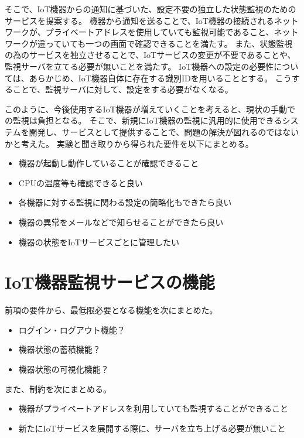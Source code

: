 そこで、IoT機器からの通知に基づいた、設定不要の独立した状態監視のためのサービスを提案する。
機器から通知を送ることで、IoT機器の接続されるネットワークが、プライベートアドレスを使用していても監視可能であること、ネットワークが違っていても一つの画面で確認できることを満たす。
また、状態監視の為のサービスを独立させることで、IoTサービスの変更が不要であることや、監視サーバを立てる必要が無いことを満たす。
IoT機器への設定の必要性については、あらかじめ、IoT機器自体に存在する識別IDを用いることとする。
こうすることで、監視サーバに対して、設定をする必要がなくなる。



このように、今後使用するIoT機器が増えていくことを考えると、現状の手動での監視は負担となる。
そこで、新規にIoT機器の監視に汎用的に使用できるシステムを開発し、サービスとして提供することで、問題の解決が図れるのではないかと考えた。
実験と聞き取りから得られた要件を以下にまとめる。
\begin{itemize}
\item 機器が起動し動作していることが確認できること
\item CPUの温度等も確認できると良い
\item 各機器に対する監視に関わる設定の簡略化もできたら良い
\item 機器の異常をメールなどで知らせることができたら良い
\item 機器の状態をIoTサービスごとに管理したい
\end{itemize}
\section{IoT機器監視サービスの機能}
前項の要件から、最低限必要となる機能を次にまとめた。
\begin{itemize}
\item ログイン・ログアウト機能？
\item 機器状態の蓄積機能？
\item 機器状態の可視化機能？
\end{itemize}
また、制約を次にまとめる。
\begin{itemize}
\item 機器がプライベートアドレスを利用していても監視することができること
\item 新たにIoTサービスを展開する際に、サーバを立ち上げる必要が無いこと
\end{itemize}





